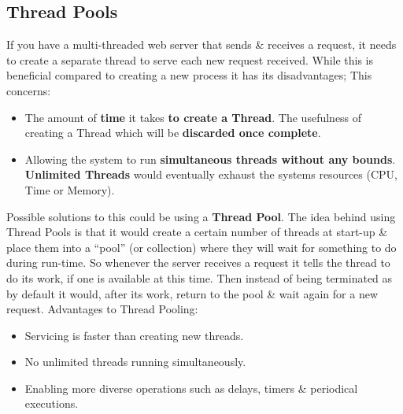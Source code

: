 \documentclass[a4paper,11pt]{article}
\begin{document}
\subsection{Thread Pools}
If you have a multi-threaded web server that sends \& receives a request, it needs to create a separate thread to serve each new request received. While this is beneficial compared to creating a new process it has its disadvantages;\cite{Operatingsystemconcepts} This concerns:
\begin{itemize}
    \item The amount of \textbf{time} it takes \textbf{to create a Thread}.
    \newline The usefulness of creating a Thread which will be \textbf{discarded once complete}.
    \item Allowing the system to run \textbf{simultaneous threads without any bounds}.
    \newline \textbf{Unlimited Threads} would eventually exhaust the systems resources (CPU, Time or Memory).
\end{itemize}
Possible solutions to this could be using a \textbf{Thread Pool}. The idea behind using Thread Pools is that it would create a certain number of threads at start-up \& place them into a “pool” (or collection) where they will wait for something to do during run-time.\cite{Operatingsystemconcepts}
So whenever the server receives a request it tells the thread to do its work, if one is available at this time. Then instead of being terminated as by default it would, after its work, return to the pool \& wait again for a new request.\cite{Operatingsystemconcepts}
\newline\newline\noindent Advantages to Thread Pooling:
\begin{itemize}
    \item Servicing is faster than creating new threads.
    \item No unlimited threads running simultaneously.
    \item Enabling more diverse operations such as delays, timers \& periodical executions.
\end{itemize}
\end{document}

